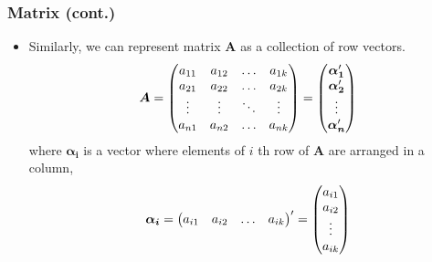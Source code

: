 \documentclass[pdflatex, 12pt]{beamer}
\begin{document}
\begin{frame}
\frametitle{Matrix (cont.)}
\begin{itemize}
\item Similarly, we can represent matrix $\bm{A}$ as a collection of row vectors.
 \begin{equation}
 \bm{A} = \begin{pmatrix}
 a_{11} & a_{12} & \ldots & a_{1k} \\
 a_{21} & a_{22} & \ldots & a_{2k} \\
 \vdots & \vdots & \ddots & \vdots \\
 a_{n1} & a_{n2} & \ldots & a_{nk} \\
 \end{pmatrix} = \begin{pmatrix}
 \bm{\alpha_1}' \\
 \bm{\alpha_2}' \\
 \vdots \\
 \bm{\alpha_n}' \\
 \end{pmatrix} \notag
 \end{equation}
where $\bm{\alpha_i}$ is a vector where elements of $i$ th row of $\bm{A}$ are arranged in a column,
 \begin{equation}
 \bm{\alpha_i} = \begin{pmatrix}
 a_{i1} & a_{i2} & \ldots & a_{ik} \\
 \end{pmatrix}'  = \begin{pmatrix}
 a_{i1} \\
 a_{i2} \\
 \vdots \\
 a_{ik}
 \end{pmatrix} \notag
 \end{equation}
\end{itemize}
\end{frame}
\end{document}
